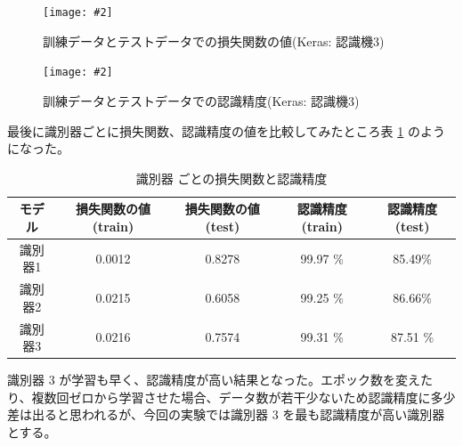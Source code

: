 \documentclass[a4paper,dvipdfmx]{jsarticle}
\newcommand{\image}[3]{
    \begin{figure}[H]
        \begin{center}
        \texttt{[image: \#2]}
        \end{center}
        \caption{#1}
        \label{#3}
    \end{figure}
}
\begin{document}
\image{訓練データとテストデータでの損失関数の値(Keras: 認識機3)}{report_b2-5.png}{fig-B2-5}
\image{訓練データとテストデータでの認識精度(Keras: 認識機3)}{report_b2-6.png}{fig-B2-6}

最後に識別器ごとに損失関数、認識精度の値を比較してみたところ表 \ref{tableB2-1} のようになった。

\begin{table}[H]
\begin{center}
\caption{識別器 ごとの損失関数と認識精度}
  \begin{tabular}{|c|c|c||c|c|} \hline
    モデル & 損失関数の値(train) & 損失関数の値(test) & 認識精度(train) & 認識精度(test) \\ \hline \hline
    識別器1 & 0.0012 & 0.8278 & 99.97 \% & 85.49\% \\ \hline
    識別器2 & 0.0215 & 0.6058 & 99.25 \% & 86.66\% \\ \hline
    識別器3 & 0.0216 & 0.7574 & 99.31 \% & 87.51 \% \\ \hline
  \end{tabular}
	\label{tableB2-1}
\end{center}
\end{table}

識別器 3 が学習も早く、認識精度が高い結果となった。エポック数を変えたり、複数回ゼロから学習させた場合、データ数が若干少ないため認識精度に多少差は出ると思われるが、今回の実験では識別器 3 を最も認識精度が高い識別器とする。
\end{document}
